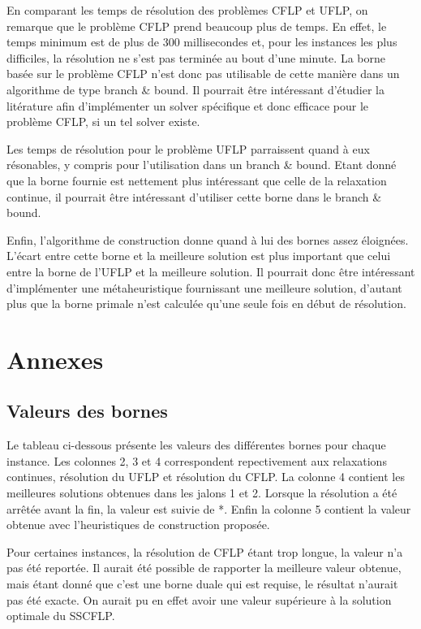 En comparant les temps de résolution des problèmes CFLP et UFLP, on remarque que le problème CFLP prend beaucoup plus de temps.
En effet, le temps minimum est de plus de 300 millisecondes et, pour les instances les plus difficiles, la résolution ne s'est pas terminée au bout d'une minute.
La borne basée sur le problème CFLP n'est donc pas utilisable de cette manière dans un algorithme de type branch \& bound.
Il pourrait être intéressant d'étudier la litérature afin d'implémenter un solver spécifique et donc efficace pour le problème CFLP, si un tel solver existe. \newline

Les temps de résolution pour le problème UFLP parraissent quand à eux résonables, y compris pour l'utilisation dans un branch \& bound.
Etant donné que la borne fournie est nettement plus intéressant que celle de la relaxation continue, il pourrait être intéressant d'utiliser cette borne dans le branch \& bound. \newline

Enfin, l'algorithme de construction donne quand à lui des bornes assez éloignées. L'écart entre cette borne et la meilleure solution est plus important que celui entre la borne de l'UFLP et la meilleure solution. Il pourrait donc être intéressant d'implémenter une métaheuristique fournissant une meilleure solution, d'autant plus que la borne primale n'est calculée qu'une seule fois en début de résolution.

\section{Annexes}

\subsection{Valeurs des bornes}

Le tableau ci-dessous présente les valeurs des différentes bornes pour chaque instance.
Les colonnes 2, 3 et 4 correspondent repectivement aux relaxations continues, résolution du UFLP et résolution du CFLP.
La colonne 4 contient les meilleures solutions obtenues dans les jalons 1 et 2.
Lorsque la résolution a été arrêtée avant la fin, la valeur est suivie de *.
Enfin la colonne 5 contient la valeur obtenue avec l'heuristiques de construction proposée. \newline

Pour certaines instances, la résolution de CFLP étant trop longue, la valeur n'a pas été reportée.
Il aurait été possible de rapporter la meilleure valeur obtenue, mais étant donné que c'est une borne duale qui est requise, le résultat n'aurait pas été exacte.
On aurait pu en effet avoir une valeur supérieure à la solution optimale du SSCFLP. \newline

